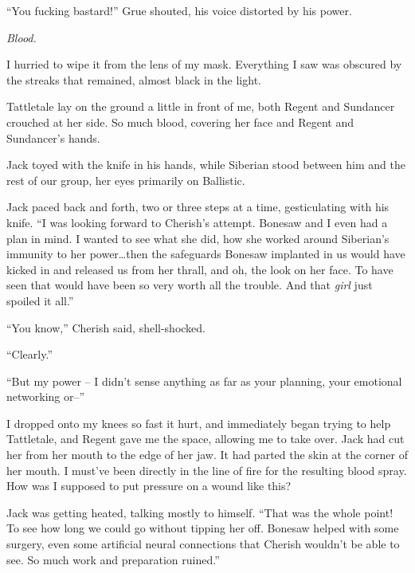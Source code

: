 ``You fucking bastard!'' Grue shouted, his voice distorted by his power.



\emph{Blood.}



I hurried to wipe it from the lens of my mask.  Everything I saw was obscured by the streaks that remained, almost black in the light.



Tattletale lay on the ground a little in front of me, both Regent and Sundancer crouched at her side.  So much blood, covering her face and Regent and Sundancer's hands.



Jack toyed with the knife in his hands, while Siberian stood between him and the rest of our group, her eyes primarily on Ballistic.



Jack paced back and forth, two or three steps at a time, gesticulating with his knife.  ``I was looking forward to Cherish's attempt.  Bonesaw and I even had a plan in mind.  I wanted to see what she did, how she worked around Siberian's immunity to her power\ldots then the safeguards Bonesaw implanted in us would have kicked in and released us from her thrall, and oh, the look on her face.  To have seen that would have been so very worth all the trouble.  And that \emph{girl} just spoiled it all.''



``You know,'' Cherish said, shell-shocked.



``Clearly.''



``But my power – I didn't sense anything as far as your planning, your emotional networking or--''



I dropped onto my knees so fast it hurt, and immediately began trying to help Tattletale, and Regent gave me the space, allowing me to take over.  Jack had cut her from her mouth to the edge of her jaw.  It had parted the skin at the corner of her mouth.  I must've been directly in the line of fire for the resulting blood spray.  How was I supposed to put pressure on a wound like this?



Jack was getting heated, talking mostly to himself.  ``That was the whole point!  To see how long we could go without tipping her off.  Bonesaw helped with some surgery, even some artificial neural connections that Cherish wouldn't be able to see.  So much work and preparation ruined.''



